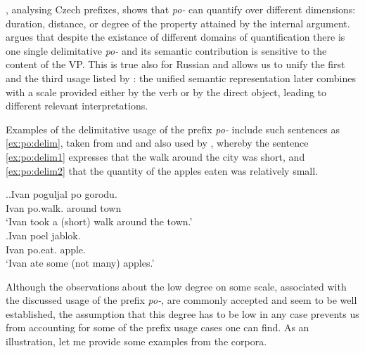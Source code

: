 \citet{Souchkova:04}, analysing Czech prefixes, shows that \textit{po-} can quantify over different dimensions: duration, distance, or degree of the property attained by the internal argument. \citeauthor{Souchkova:04} argues that despite the existance of different domains of quantification there is one single delimitative \textit{po-} and its semantic contribution is sensitive to the content of the VP. This is true also for Russian and allows us to unify the first and the third usage listed by \citet{Shvedova:82}: the unified semantic representation later combines with a scale provided either by the verb or by the direct object, leading to different relevant interpretations.

Examples of the delimitative usage of the prefix \textit{po-} include such sentences as \ref{ex:po:delim}, taken from \citet{Filip:00} and \citet{Souchkova:04} and also used by \citet{Kagan:book}, whereby the sentence \ref{ex:po:delim1} expresses that the walk around the city was short, and \ref{ex:po:delim2} that the quantity of the apples eaten was relatively small.

\ex.\label{ex:po:delim}\ag.\label{ex:po:delim1}Ivan poguljal po gorodu.\\
Ivan po.walk. around town\\
\trans `Ivan took a (short) walk around the town.'\\
\bg.\label{ex:po:delim2}Ivan poel jablok.\\
Ivan po.eat. apple.\\
\trans `Ivan ate some (not many) apples.'


Although the observations about the low degree on some scale, associated with the discussed usage of the prefix \textit{po-}, are commonly accepted and seem to be well established, the assumption that this degree has to be low in any case prevents us from accounting for some of the prefix usage cases one can find. As an illustration, let me provide some examples from the corpora.

